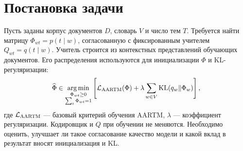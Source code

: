 \section{Постановка задачи}
Пусть заданы корпус документов $D$, словарь $V$ и число тем $T$. Требуется найти матрицу $\Phi_{wt}=p(t\mid w)$, согласованную с фиксированным учителем $Q_{wt}=q(t\mid w)$. Учитель строится из контекстных представлений обучающих документов. Его распределения используются для инициализации $\Phi$ и KL-регуляризации:
\begin{equation}
 \widehat\Phi\in\underset{\substack{\Phi_{wt}\geq0\\\sum_t\Phi_{wt}=1}}{\arg\min}
 \left[\mathcal L_{\rm AARTM}(\Phi)+\lambda\sum_{w\in V}\operatorname{KL}(q_w\Vert\Phi_w)\right],
 \label{eq:objective}
\end{equation}
где $\mathcal L_{\rm AARTM}$ --- базовый критерий обучения AARTM, $\lambda$ --- коэффициент регуляризации. Кодировщик и $Q$ при обучении не меняются. Необходимо оценить, улучшает ли такое согласование качество модели и какой вклад в результат вносят инициализация и KL.
